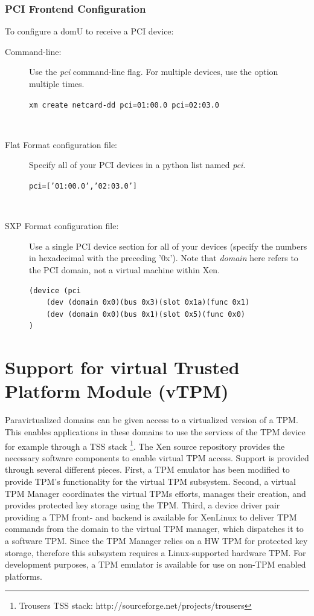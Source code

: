 \documentclass[11pt,twoside,final,openright]{report}
\begin{document}
\subsubsection{PCI Frontend Configuration}
To configure a domU to receive a PCI device:

\begin{description}
\item[Command-line:]
  Use the {\em pci} command-line flag. For multiple devices, use the option
  multiple times. \\
\centerline{  {\tt xm create netcard-dd pci=01:00.0 pci=02:03.0 }} \\

\item[Flat Format configuration file:]
  Specify all of your PCI devices in a python list named {\em pci}. \\
\centerline{  {\tt pci=['01:00.0','02:03.0'] }} \\

\item[SXP Format configuration file:]
  Use a single PCI device section for all of your devices (specify the numbers
  in hexadecimal with the preceding '0x'). Note that {\em domain} here refers
  to the PCI domain, not a virtual machine within Xen.
{\small
\begin{verbatim}
(device (pci
    (dev (domain 0x0)(bus 0x3)(slot 0x1a)(func 0x1)
    (dev (domain 0x0)(bus 0x1)(slot 0x5)(func 0x0)
)
\end{verbatim}
}
\end{description}


\section{Support for virtual Trusted Platform Module (vTPM)}
\label{ss:vtpm}

Paravirtualized domains can be given access to a virtualized version
of a TPM. This enables applications in these domains to use the services
of the TPM device for example through a TSS stack
\footnote{Trousers TSS stack: http://sourceforge.net/projects/trousers}.
The Xen source repository provides the necessary software components to
enable virtual TPM access. Support is provided through several
different pieces. First, a TPM emulator has been modified to provide TPM's
functionality for the virtual TPM subsystem. Second, a virtual TPM Manager
coordinates the virtual TPMs efforts, manages their creation, and provides
protected key storage using the TPM. Third, a device driver pair providing
a TPM front- and backend is available for XenLinux to deliver TPM commands
from the domain to the virtual TPM manager, which dispatches it to a
software TPM. Since the TPM Manager relies on a HW TPM for protected key
storage, therefore this subsystem requires a Linux-supported hardware TPM.
For development purposes, a TPM emulator is available for use on non-TPM
enabled platforms.
\end{document}
